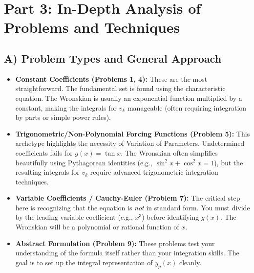 \documentclass[12pt]{article}
\begin{document}
\newpage
\section{Part 3: In-Depth Analysis of Problems and Techniques}

\subsection{A) Problem Types and General Approach}
\begin{itemize}
    \item \textbf{Constant Coefficients (Problems 1, 4):} These are the most straightforward. The fundamental set is found using the characteristic equation. The Wronskian is usually an exponential function multiplied by a constant, making the integrals for $v_k$ manageable (often requiring integration by parts or simple power rules).
    \item \textbf{Trigonometric/Non-Polynomial Forcing Functions (Problem 5):} This archetype highlights the necessity of Variation of Parameters. Undetermined coefficients fails for $g(x) = \tan x$. The Wronskian often simplifies beautifully using Pythagorean identities (e.g., $\sin^2 x + \cos^2 x = 1$), but the resulting integrals for $v_k$ require advanced trigonometric integration techniques.
    \item \textbf{Variable Coefficients / Cauchy-Euler (Problem 7):} The critical step here is recognizing that the equation is \textit{not} in standard form. You must divide by the leading variable coefficient (e.g., $x^3$) before identifying $g(x)$. The Wronskian will be a polynomial or rational function of $x$.
    \item \textbf{Abstract Formulation (Problem 9):} These problems test your understanding of the formula itself rather than your integration skills. The goal is to set up the integral representation of $y_p(x)$ cleanly.
\end{itemize}
\end{document}
